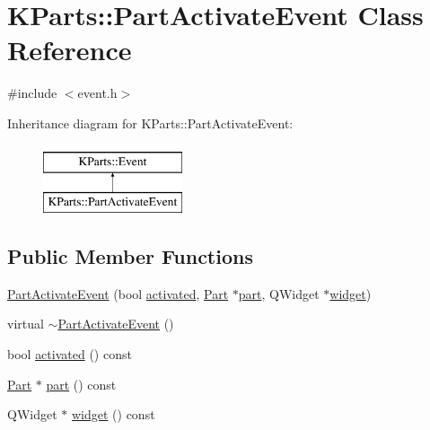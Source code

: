 \hypertarget{classKParts_1_1PartActivateEvent}{\section{\-K\-Parts\-:\-:\-Part\-Activate\-Event \-Class \-Reference}
\label{classKParts_1_1PartActivateEvent}
}


{\ttfamily \#include $<$event.\-h$>$}

\-Inheritance diagram for \-K\-Parts\-:\-:\-Part\-Activate\-Event\-:\begin{figure}[H]
\begin{center}
\leavevmode
\includegraphics[height=2.000000cm]{classKParts_1_1PartActivateEvent}
\end{center}
\end{figure}
\subsection*{\-Public \-Member \-Functions}
\begin{DoxyCompactItemize}
\item 
\hyperlink{classKParts_1_1PartActivateEvent_a6b2b2b39fc6e8518b74e74f0f5f3947d}{\-Part\-Activate\-Event} (bool \hyperlink{classKParts_1_1PartActivateEvent_a7d6c164caa76842171eed19df734715b}{activated}, \hyperlink{classKParts_1_1Part}{\-Part} $\ast$\hyperlink{classKParts_1_1PartActivateEvent_a5588cf3b52a16cc65586a3faf6523117}{part}, \-Q\-Widget $\ast$\hyperlink{classKParts_1_1PartActivateEvent_ae3ec0f57c3c257eb13e4cf8c5d551f81}{widget})
\item 
virtual \hyperlink{classKParts_1_1PartActivateEvent_a070038fad91c9494c6ef4dfd00401f62}{$\sim$\-Part\-Activate\-Event} ()
\item 
bool \hyperlink{classKParts_1_1PartActivateEvent_a7d6c164caa76842171eed19df734715b}{activated} () const 
\item 
\hyperlink{classKParts_1_1Part}{\-Part} $\ast$ \hyperlink{classKParts_1_1PartActivateEvent_a5588cf3b52a16cc65586a3faf6523117}{part} () const 
\item 
\-Q\-Widget $\ast$ \hyperlink{classKParts_1_1PartActivateEvent_ae3ec0f57c3c257eb13e4cf8c5d551f81}{widget} () const 
\end{DoxyCompactItemize}
